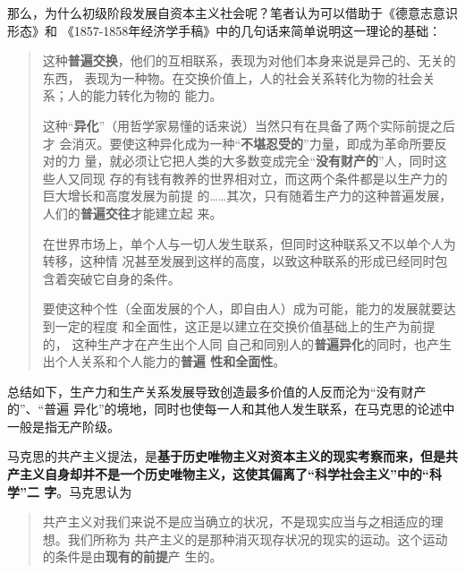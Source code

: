 那么，为什么初级阶段发展自资本主义社会呢？笔者认为可以借助于《德意志意识形态》和
《1857-1858年经济学手稿》中的几句话来简单说明这一理论的基础：
\begin{quotation}
  这种\textbf{普遍交换}，他们的互相联系，表现为对他们本身来说是异己的、无关的东西，
  表现为一种物。在交换价值上，人的社会关系转化为物的社会关系；人的能力转化为物的
  能力。

  这种``\textbf{异化}''（用哲学家易懂的话来说）当然只有在具备了两个实际前提之后才
  会消灭。要使这种异化成为一种``\textbf{不堪忍受的}''力量，即成为革命所要反对的力
  量，就必须让它把人类的大多数变成完全``\textbf{没有财产的}''人，同时这些人又同现
  存的有钱有教养的世界相对立，而这两个条件都是以生产力的巨大增长和高度发展为前提
  的……其次，只有随着生产力的这种普遍发展，人们的\textbf{普遍交往}才能建立起
  来。

  在世界市场上，单个人与一切人发生联系，但同时这种联系又不以单个人为转移，这种情
  况甚至发展到这样的高度，以致这种联系的形成已经同时包含着突破它自身的条件。

  要使这种个性（全面发展的个人，即自由人）成为可能，能力的发展就要达到一定的程度
  和全面性，这正是以建立在交换价值基础上的生产为前提的， 这种生产才在产生出个人同
  自己和同别人的\textbf{普遍异化}的同时，也产生出个人关系和个人能力的\textbf{普遍
    性和全面性}。
\end{quotation}

总结如下，生产力和生产关系发展导致创造最多价值的人反而沦为“没有财产的”、``普遍
异化''的境地，同时也使每一人和其他人发生联系，在马克思的论述中一般是指无产阶级。

马克思的共产主义提法，是\textbf{基于历史唯物主义对资本主义的现实考察而来，但是共
  产主义自身却并不是一个历史唯物主义，这使其偏离了``科学社会主义''中的``科学''二
  字}。马克思认为
\begin{quotation}
  共产主义对我们来说不是应当确立的状况，不是现实应当与之相适应的理想。我们所称为
  共产主义的是那种消灭现存状况的现实的运动。这个运动的条件是由\textbf{现有的前提}产
  生的。
\end{quotation}

